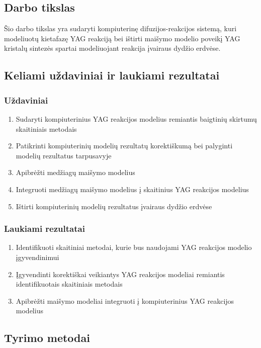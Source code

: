 \documentclass[]{VUMIFTemplateClass}
\begin{document}
\subsection{Darbo tikslas}

Šio darbo tikslas yra sudaryti kompiuterinę difuzijos-reakcijos sistemą, kuri modeliuotų kietafazę YAG reakciją bei ištirti maišymo modelio poveikį YAG kristalų sintezės spartai modeliuojant reakcija įvairaus dydžio erdvėse.

\subsection{Keliami uždaviniai ir laukiami rezultatai}
\subsubsection{Uždaviniai}
\begin{enumerate}
  
    \item Sudaryti kompiuterinius YAG reakcijos modelius remiantis baigtinių skirtumų skaitiniais metodais
    \item Patikrinti kompiuterinių modelių rezultatų korektiškumą bei palyginti modelių rezultatus tarpusavyje
    \item Apibrėžti medžiagų maišymo modelius
    \item Integruoti medžiagų maišymo modelius į skaitinius YAG reakcijos modelius
    \item Ištirti kompiuterinių modelių rezultatus įvairaus dydžio erdvėse
\end{enumerate}
\subsubsection{Laukiami rezultatai}
\begin{enumerate}
    \item Identifikuoti skaitiniai metodai, kurie bus naudojami YAG reakcijos modelio įgyvendinimui

    \item Įgyvendinti korektiškai veikiantys YAG reakcijos modeliai remiantis identifikuotais skaitiniais metodais

    \item Apibrėžti maišymo modeliai integruoti į kompiuterinius YAG reakcijos modelius

\end{enumerate}

\subsection{Tyrimo metodai}
\end{document}
